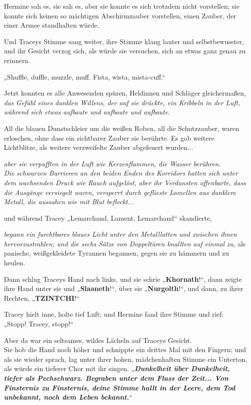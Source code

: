 {Hermine sah es, sie sah es, aber sie konnte es sich trotzdem nicht vorstellen; sie konnte sich keinen so mächtigen Abschirmzauber vorstellen, einen Zauber, der einer Armee standhalten würde.

Und Traceys Stimme sang weiter, ihre Stimme klang lauter und selbstbewusster, und ihr Gesicht verzog sich, als würde sie versuchen, sich an etwas ganz genau zu erinnern.

„Shuffle, duffle, muzzle, muff. Fista, wista, mista-cuff.“

Jetzt konnten es alle Anwesenden spüren, Heldinnen und Schläger gleichermaßen, \emph{das Gefühl eines dunklen Willens, der auf sie drückte, ein Kribbeln in der Luft, während sich etwas aufbaute und aufbaute und aufbaute.}

All die blauen Dunstschleier um die weißen Roben, all die Schutzzauber, waren erloschen, ohne dass ein sichtbarer Zauber sie berührte. Es gab weitere Lichtblitze, als weitere verzweifelte Zauber abgefeuert wurden...

\emph{aber sie verpufften in der Luft wie Kerzenflammen, die Wasser berühren.}\\ \emph{Die schwarzen Barrieren an den beiden Enden des Korridors hatten sich unter dem wachsenden Druck wie Rauch aufgelöst, aber ihr Verdunsten offenbarte, dass die} \emph{Ausgänge versiegelt waren, versperrt durch geflieste Lamellen aus dunklem Metall, die aussahen wie mit Blut befleckt...}

und während Tracey „Lemarchand, Lament, Lemarchand“ skandierte,

\emph{begann ein furchtbares blaues Licht unter den Metalllatten und zwischen ihnen hervorzustrahlen; und die sechs Sätze von Doppeltüren knallten auf einmal zu}, als panische, weißgekleidete Tyrannen begannen, gegen sie zu hämmern und zu heulen.

Dann schlug Traceys Hand nach links, und sie schrie „\textbf{Khornath}!“, dann zeigte ihre Hand unter sie und „\textbf{Slaaneth}!“, über sie „\textbf{Nurgolth}!“, und dann, zu ihrer Rechten, „\textbf{TZINTCHI}!“

Tracey hielt inne, holte tief Luft; und Hermine fand ihre Stimme und rief: „Stopp! Tracey, stopp!“

Aber da war ein seltsames, wildes Lächeln auf Traceys Gesicht.\\ Sie hob die Hand noch höher und schnippte ein drittes Mal mit den Fingern; und als sie wieder sprach, lag unter ihrer hohen, mädchenhaften Stimme ein Unterton, als würde ein tieferer Chor mit ihr singen. „\textbf{\emph{Dunkelheit über Dunkelheit, tiefer als Pechschwarz. Begraben unter dem Fluss der Zeit... Von Finsternis zu Finsternis, deine Stimme hallt in der Leere, dem Tod unbekannt, noch dem Leben bekannt.}}“

}
